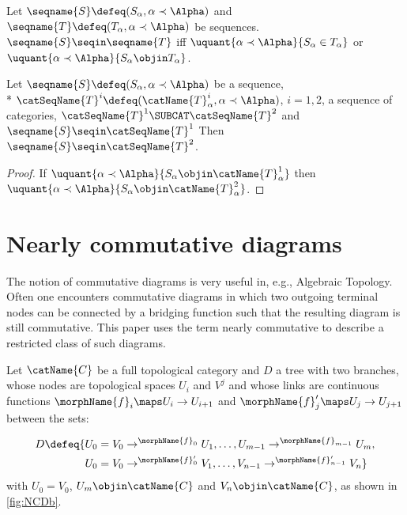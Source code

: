 \documentclass{article}
\begin{document}
\begin{definition}
\label{def:seqin}
Let $\seqname{S} \defeq (S_\alpha, \alpha \prec \Alpha)$ and
$\seqname{T} \defeq (T_\alpha, \alpha \prec \Alpha)$ be sequences.
$\seqname{S} \seqin \seqname{T}$ iff
$\uquant{\alpha \prec \Alpha} {S_\alpha \in T_\alpha}$ or
$\uquant{\alpha \prec \Alpha} {S_\alpha \objin T_\alpha}$.
\end{definition}

\begin{lemma}
\label{lem:seqin}
Let $\seqname{S} \defeq (S_\alpha, \alpha \prec \Alpha)$
be a sequence, \\*
\nobreaks
{{
  $
    \catSeqName{T}^i \defeq
    (\catName{T}^i_\alpha, \alpha \prec \Alpha)
  $,
}}
$i=1,2$, a sequence of
categories, $\catSeqName{T}^1 \SUBCAT \catSeqName{T}^2$ and
$\seqname{S} \seqin \catSeqName{T}^1$ Then
$\seqname{S} \seqin \catSeqName{T}^2$.

\begin{proof}
If
$\uquant{\alpha \prec \Alpha} {S_\alpha \objin \catName{T}^1_\alpha}$
then
$\uquant{\alpha \prec \Alpha} {S_\alpha \objin \catName{T}^2_\alpha}$.
\end{proof}
\end{lemma}

\part{Nearly commutative diagrams}
\label{part:ncd}
The notion of commutative diagrams is very useful in, e.g., Algebraic
Topology. Often one encounters commutative diagrams in which two
outgoing terminal nodes can be connected by a bridging function such
that the resulting diagram is still commutative. This paper uses the
term nearly commutative to describe a restricted class of such diagrams.

Let $\catName{C}$ be a full topological category and $D$ a tree with two
branches, whose nodes are topological spaces $U_i$ and $V^j$ and whose
links are continuous functions $\morphName{f}_i \maps U_i \to U_{i+1}$
and $\morphName{f}'_j \maps U_j \to U_{j+1}$ between the sets:

\begin{equation}
\begin{split}
\label{eq:NCD}
D \defeq \{
  &
    U_0 = V_0 \to^{\morphName{f}_0} U_1,
    \dotsc,
    U_{m-1} \to^{\morphName{f}_{m-1}} U_m,
\\
  &
    U_0 = V_0 \to^{\morphName{f}'_0} V_1,
    \dotsc,
    V_{n-1} \to^{\morphName{f}'_{n-1}} V_n
\}
\end{split}
\end{equation}
with $U_0 = V_0$, $U_m \objin \catName{C}$ and
$V_n \objin \catName{C}$, as shown in
{
  \showlabelsinline
  \cref{fig:NCDb}.
}
\end{document}

